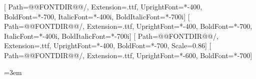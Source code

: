\usepackage{fontspec}
\setmainfont{DMSans}[
  Path=@@FONTDIR@@/,
  Extension=.ttf, UprightFont=*-400, BoldFont=*-700, ItalicFont=*-400i, BoldItalicFont=*-700i]
\setsansfont{DMSans}[
  Path=@@FONTDIR@@/,
  Extension=.ttf, UprightFont=*-400, BoldFont=*-700, ItalicFont=*-400i, BoldItalicFont=*-700i]
\setmonofont{JetBrainsMono}[
  Path=@@FONTDIR@@/,
  Extension=.ttf, UprightFont=*-400, BoldFont=*-700, Scale=0.86]
[
  Path=@@FONTDIR@@/,
  Extension=.ttf, UprightFont=*-600, BoldFont=*-700]

\usepackage{microtype}
\usepackage[none]{hyphenat}
\sloppy
\emergencystretch=3em
\setlength{\parskip}{0.5\baselineskip}
\setlength{\parindent}{0pt}
\linespread{1.05}

\usepackage{fvextra}

\usepackage[dvipsnames,svgnames]{xcolor}
\color{sdwprimary}

\setcounter{secnumdepth}{0}

